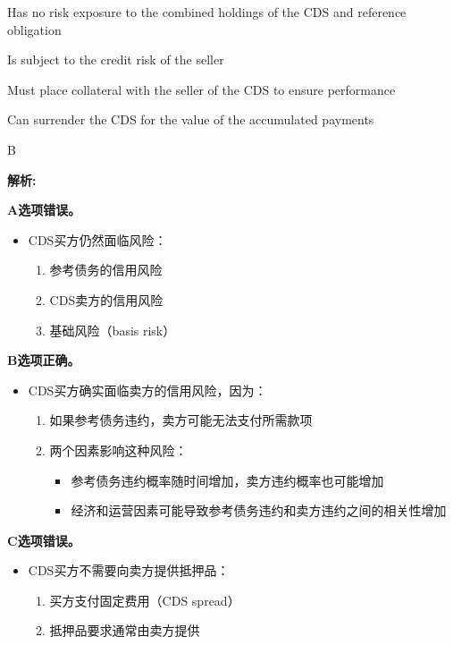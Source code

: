 \documentclass{article}
\newenvironment{explanation}
{\textbf{解析:}\par}
{\par}
\begin{document}
\begin{choices}
    \item Has no risk exposure to the combined holdings of the CDS and reference obligation
    \item Is subject to the credit risk of the seller
    \item Must place collateral with the seller of the CDS to ensure performance
    \item Can surrender the CDS for the value of the accumulated payments
\end{choices}

\begin{correctanswer}
    B
\end{correctanswer}

\begin{explanation}
    \textbf{A选项错误。}
    \begin{itemize}
        \item CDS买方仍然面临风险：
        \begin{enumerate}
            \item 参考债务的信用风险
            \item CDS卖方的信用风险
            \item 基础风险（basis risk）
        \end{enumerate}
    \end{itemize}
    
    \textbf{B选项正确。}
    \begin{itemize}
        \item CDS买方确实面临卖方的信用风险，因为：
        \begin{enumerate}
            \item 如果参考债务违约，卖方可能无法支付所需款项
            \item 两个因素影响这种风险：
            \begin{itemize}
                \item 参考债务违约概率随时间增加，卖方违约概率也可能增加
                \item 经济和运营因素可能导致参考债务违约和卖方违约之间的相关性增加
            \end{itemize}
        \end{enumerate}
    \end{itemize}
    
    \textbf{C选项错误。}
    \begin{itemize}
        \item CDS买方不需要向卖方提供抵押品：
        \begin{enumerate}
            \item 买方支付固定费用（CDS spread）
            \item 抵押品要求通常由卖方提供
        \end{enumerate}
    \end{itemize}
    

\end{explanation}
\end{document}
